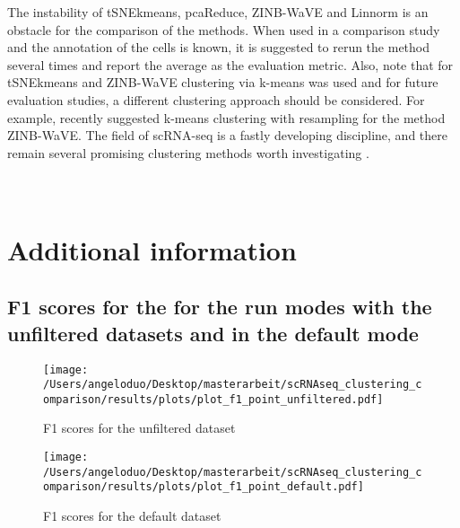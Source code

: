 \documentclass[12pt, a4paper]{article}\usepackage[]{graphicx}\usepackage[]{color}
\begin{document}
The instability of tSNEkmeans, pcaReduce, ZINB-WaVE and Linnorm is an obstacle for the comparison of the methods. When used in a comparison study and the annotation of the cells is known,  it is suggested to rerun the method several times and report the average as the evaluation metric.  Also, note that for tSNEkmeans and ZINB-WaVE clustering via k-means was used and for future evaluation studies, a different clustering approach should be considered. For example, \citet{perraudeau2017bioconductor} recently suggested k-means clustering with resampling for the method ZINB-WaVE.
The field of scRNA-seq is a fastly developing discipline, and there remain several promising clustering methods worth investigating \citep{ van2017magic, sinha2018dropclust, sun2017dimm, yang2017safe}.






\clearpage


\clearpage

\appendix 
\section{\\Additional information}
\subsection{F1 scores for the for the run modes with the unfiltered datasets and in the default mode}
\begin{figure}[H]
\centering
\texttt{[image: /Users/angeloduo/Desktop/masterarbeit/scRNAseq\_clustering\_comparison/results/plots/plot\_f1\_point\_unfiltered.pdf]}
\caption{F1 scores for the unfiltered dataset }
\label{fig:f1pointunf}
\end{figure}

\begin{figure}[!h]
\centering
\texttt{[image: /Users/angeloduo/Desktop/masterarbeit/scRNAseq\_clustering\_comparison/results/plots/plot\_f1\_point\_default.pdf]}
\caption{F1 scores for the default  dataset }
\label{fig:f1poindef}
\end{figure}
\end{document}
